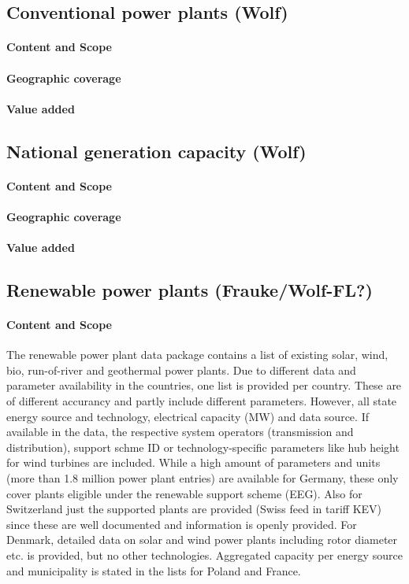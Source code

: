 \documentclass[article]{elsarticle}
\begin{document}
\subsection{Conventional power plants (Wolf)}
\paragraph{Content and Scope}
\paragraph{Geographic coverage}
\paragraph{Value added}

\subsection{National generation capacity (Wolf)}
\paragraph{Content and Scope}
\paragraph{Geographic coverage}
\paragraph{Value added}

\subsection{Renewable power plants (Frauke/Wolf-FL?)}
\paragraph{Content and Scope}
The renewable power plant data package contains a list of existing solar, wind, bio, run-of-river and geothermal power plants. Due to different data and parameter availability in the countries, one list is provided per country. These are of different accurancy and partly include different parameters. However, all state energy source and technology, electrical capacity (MW) and data source. If available in the data, the respective system operators (transmission and distribution), support schme ID or technology-specific parameters like hub height for wind turbines are included. While a high amount of parameters and units (more than 1.8 million power plant entries) are available for Germany, these only cover plants eligible under the renewable support scheme (EEG). Also for Switzerland just the supported plants are provided (Swiss feed in tariff KEV) since these are well documented and information is openly provided. For Denmark, detailed data on solar and wind power plants including rotor diameter etc. is provided, but no other technologies. Aggregated capacity per energy source and municipality is stated in the lists for Poland and France.
\end{document}
